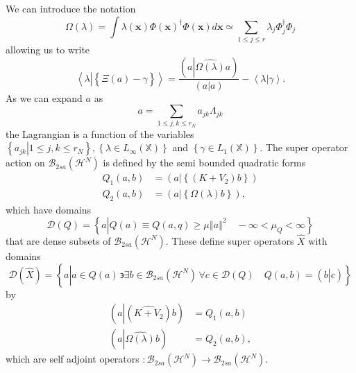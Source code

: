 \documentclass[aps,preprint]{revtex4}%
\begin{document}
We can introduce the notation
\begin{equation}
\Omega\left(  \lambda\right)  =\int\lambda\left(  \mathbf{x}\right)
\Phi\left(  \mathbf{x}\right)  ^{\dagger}\Phi\left(  \mathbf{x}\right)
d\mathbf{x\simeq}\sum_{1\leq j\leq r}\lambda_{j}\Phi_{j}^{\dagger}\Phi_{j}%
\end{equation}
allowing us to write
\begin{equation}
\left\langle \lambda\left\vert \left\{  \overset{}{\Xi\left(  a\right)
-\gamma}\right\}  \right.  \right\rangle =\frac{\left(  a\left\vert
\widehat{\Omega\left(  \lambda\right)  }\right.  a\right)  }{\left(
\overset{}{a}\left\vert a\right.  \right)  }-\left\langle \lambda\left\vert
\overset{}{\gamma}\right.  \right\rangle .
\end{equation}
As we can expand $a$ as
\begin{equation}
a=\sum_{1\leq j,k\leq r_{N}}a_{jk}\Lambda_{jk}%
\end{equation}
the Lagrangian is a function of the variables $\left\{  \left.  a_{jk}%
\right\vert 1\leq j,k\leq r_{N}\right\}  ,\left\{  \lambda\in L_{\infty
}\left(  \mathbb{X}\right)  \right\}  $ and $\left\{  \gamma\in L_{1}\left(
\mathbb{X}\right)  \right\}  .$ The super operator action on $\mathcal{B}%
_{2sa}\left(  \mathcal{H}^{N}\right)  $ is defined by the semi bounded
quadratic forms
\begin{align}
Q_{1}\left(  a,b\right)   &  =\left(  a\left\vert \left\{  \left(
K+V_{2}\right)  b\right\}  \right.  \right) \nonumber\\
Q_{2}\left(  a,b\right)   &  =\left(  a\left\vert \left\{  \Omega\left(
\lambda\right)  b\right\}  \right.  \right)  ,
\end{align}
which have domains
\begin{equation}
\mathcal{D}\left(  Q\right)  =\left\{  a\left\vert Q\left(  a\right)  \equiv
Q\left(  a,q\right)  \geq\mu\left\Vert a\right\Vert ^{2}\right.  \quad
-\infty<\mu_{Q}<\infty\right\}
\end{equation}
that are dense subsets of $\mathcal{B}_{2sa}\left(  \mathcal{H}^{N}\right)  .$
These define super operators $\widehat{X}$ with domains
\begin{equation}
\mathcal{D}\left(  \widehat{X}\right)  =\left\{  a\left\vert \overset{}{a\in
Q\left(  a\right)  \,\backepsilon\exists b\in\mathcal{B}_{2sa}\left(
\mathcal{H}^{N}\right)  \,\forall c\in\mathcal{D}\left(  Q\right)  \quad
Q\left(  a,b\right)  =\left(  \left.  \overset{}{b}\right\vert c\right)
}\right.  \right\}
\end{equation}
by
\begin{align}
\left(  a\left\vert \left(  \widehat{K+V_{2}}\right)  \right.  b\right)   &
=Q_{1}\left(  a,b\right) \nonumber\\
\left(  a\left\vert \widehat{\Omega\left(  \lambda\right)  }\right.  b\right)
&  =Q_{2}\left(  a,b\right)  ,
\end{align}
which are self adjoint operators $:\mathcal{B}_{2sa}\left(  \mathcal{H}%
^{N}\right)  \rightarrow\mathcal{B}_{2sa}\left(  \mathcal{H}^{N}\right)  .$
\end{document}
